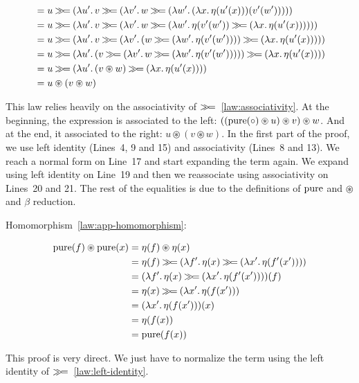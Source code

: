 \begin{align}
  &= u \hsbind (\lam{u'}{v \hsbind (\lam{v'}{w \hsbind (\lam{w'}{(\lam{x}{\eta(u'(x))})(v'(w'))})})}) \\
  &= u \hsbind (\lam{u'}{v \hsbind (\lam{v'}{w \hsbind (\lam{w'}{\eta(v'(w')) \hsbind (\lam{x}{\eta(u'(x))})})})}) \\
  &= u \hsbind (\lam{u'}{v \hsbind (\lam{v'}{(w \hsbind (\lam{w'}{\eta(v'(w'))})) \hsbind (\lam{x}{\eta(u'(x))})})}) \\
  &= u \hsbind (\lam{u'}{(v \hsbind (\lam{v'}{w \hsbind (\lam{w'}{\eta(v'(w'))})})) \hsbind (\lam{x}{\eta(u'(x))})}) \\
  &= u \hsbind (\lam{u'}{(v \circledast w) \hsbind (\lam{x}{\eta(u'(x))})}) \\
  &= u \circledast (v \circledast w)
\end{align}
\setcounter{equation}{\value{TemporaryCounter}}
\ChapterPrefix

This law relies heavily on the associativity of
$\mathbin{\gg\!=}$~\eqref{law:associativity}. At the beginning, the expression is
associated to the left:
$((\operatorname{pure}({\mathbin{\circ}}) \circledast u) \circledast v) \circledast w$. And at the
end, it associated to the right: $u \circledast (v \circledast w)$. In the
first part of the proof, we use left identity (Lines~4, 9 and 15) and
associativity (Lines~8 and 13). We reach a normal form on Line~17 and start
expanding the term again. We expand using left identity on Line~19 and then
we reassociate using associativity on Lines~20 and 21. The rest of the
equalities is due to the definitions of $\operatorname{pure}$ and $\circledast$ and
$\beta$ reduction.

Homomorphism~\eqref{law:app-homomorphism}:

\setcounter{TemporaryCounter}{\value{equation}}
\setcounter{equation}{0}
\NoChapterPrefix
\begin{align}
\operatorname{pure}(f) \circledast \operatorname{pure}(x)
&= \eta(f) \circledast \eta(x) \\
&= \eta(f) \mathbin{\gg\!=} (\lambda f'.\, \eta(x) \mathbin{\gg\!=} (\lambda x'.\, \eta(f'(x')))) \\
&= (\lambda f'.\, \eta(x) \mathbin{\gg\!=} (\lambda x'.\, \eta(f'(x'))))(f) \\
&= \eta(x) \mathbin{\gg\!=} (\lambda x'.\, \eta(f(x'))) \\
&= (\lambda x'.\, \eta(f(x')))(x) \\
&= \eta(f(x)) \\
&= \operatorname{pure}(f(x))
\end{align}
\setcounter{equation}{\value{TemporaryCounter}}
\ChapterPrefix

This proof is very direct. We just have to normalize the term using the
left identity of $\mathbin{\gg\!=}$~\eqref{law:left-identity}.

